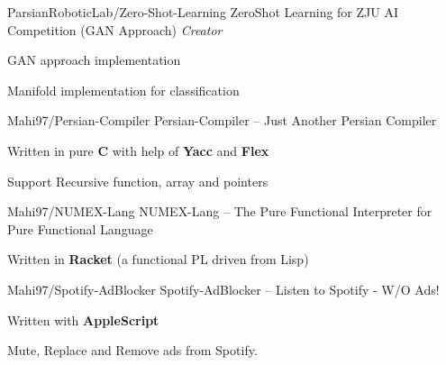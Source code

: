 \begin{cventries}
  \cventry
    {ParsianRoboticLab/Zero-Shot-Learning} %
    {ZeroShot Learning for ZJU AI Competition (GAN Approach)} %
    {\textit{Creator}} %
    {} %
    {
      \begin{cvitems} %
        \item {GAN approach implementation}
        \item {Manifold implementation for classification}
      \end{cvitems}
    }


  \cventry
    {Mahi97/Persian-Compiler} %
    {Persian-Compiler -- Just Another Persian Compiler} %
    {} %
    {} %
    {
      \begin{cvitems} %
        \item {Written in pure \textbf{C} with help of \textbf{Yacc} and \textbf{Flex}}
        \item {Support Recursive function, array and pointers}
      \end{cvitems}
    }

  \cventry
    {Mahi97/NUMEX-Lang} %
    {NUMEX-Lang -- The Pure Functional Interpreter for Pure Functional Language} %
    {} %
    {} %
    {
      \begin{cvitems} %
        \item {Written in \textbf{Racket} (a functional PL driven from Lisp)}
      \end{cvitems}
    }

  \cventry
    {Mahi97/Spotify-AdBlocker} %
    {Spotify-AdBlocker -- Listen to Spotify - W/O Ads!} %
    {} %
    {} %
    {
      \begin{cvitems} %
        \item {Written with \textbf{AppleScript}}
        \item {Mute, Replace and Remove ads from Spotify.}
      \end{cvitems}
    }


\end{cventries}
